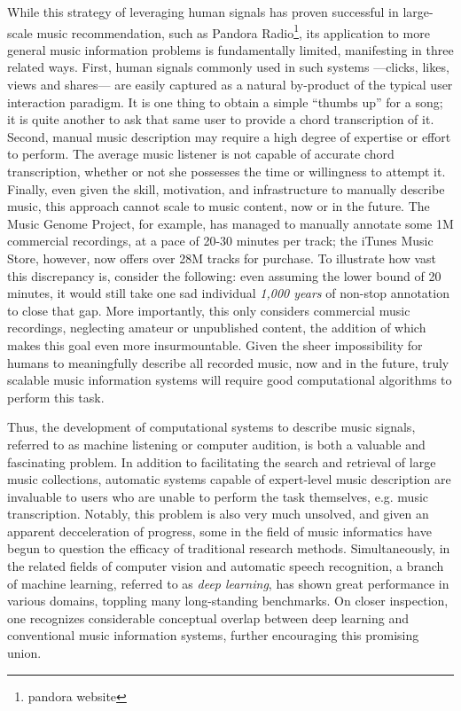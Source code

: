 While this strategy of leveraging human signals has proven successful in large-scale music recommendation, such as Pandora Radio\footnote{pandora website}, its application to more general music information problems is fundamentally limited, manifesting in three related ways.
First, human signals commonly used in such systems ---clicks, likes, views and shares--- are easily captured as a natural by-product of the typical user interaction paradigm.
It is one thing to obtain a simple ``thumbs up'' for a song; it is quite another to ask that same user to provide a chord transcription of it.
Second, manual music description may require a high degree of expertise or effort to perform.
The average music listener is not capable of accurate chord transcription, whether or not she possesses the time or willingness to attempt it.
Finally, even given the skill, motivation, and infrastructure to manually describe music, this approach cannot scale to  music content, now or in the future.
The Music Genome Project, for example, has managed to manually annotate some 1M commercial recordings, at a pace of 20-30 minutes per track; the iTunes Music Store, however, now offers over 28M tracks for purchase.
To illustrate how vast this discrepancy is, consider the following: even assuming the lower bound of 20 minutes, it would still take one sad individual \emph{1,000 years} of non-stop annotation to close that gap.
More importantly, this only considers commercial music recordings, neglecting amateur or unpublished content, the addition of which makes this goal even more insurmountable.
Given the sheer impossibility for humans to meaningfully describe all recorded music, now and in the future, truly scalable music information systems will require good computational algorithms to perform this task.

Thus, the development of computational systems to describe music signals, referred to as machine listening or computer audition, is both a valuable and fascinating problem.
In addition to facilitating the search and retrieval of large music collections, automatic systems capable of expert-level music description are invaluable to users who are unable to perform the task themselves, e.g. music transcription.
Notably, this problem is also very much unsolved, and given an apparent decceleration of progress, some in the field of music informatics have begun to question the efficacy of traditional research methods.
Simultaneously, in the related fields of computer vision and automatic speech recognition, a branch of machine learning, referred to as \emph{deep learning}, has shown great performance in various domains, toppling many long-standing benchmarks.
On closer inspection, one recognizes considerable conceptual overlap between deep learning and conventional music information systems, further encouraging this promising union.

